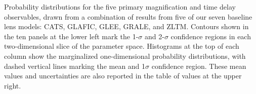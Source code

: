 Probability distributions for the five primary magnification and time
delay observables, drawn from a combination of results from five of
our seven baseline lens models: CATS, GLAFIC, GLEE, GRALE, and ZLTM.
Contours shown in the ten panels at the lower left mark the 1-$\sigma$
and 2-$\sigma$ confidence regions in each two-dimensional slice of the
parameter space. Histograms at the top of each column show the
marginalized one-dimensional probability distributions, with dashed
vertical lines marking the mean and 1$\sigma$ confidence region.
These mean values and uncertainties are also reported in the table of
values at the upper right.
\label{fig:LensModelContours}

